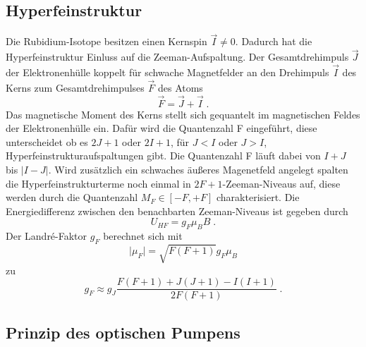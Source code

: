 \subsection{Hyperfeinstruktur}
Die Rubidium-Isotope besitzen einen Kernspin $\vec{I} \neq 0$. Dadurch hat die Hyperfeinstruktur 
Einluss auf die Zeeman-Aufspaltung. Der Gesamtdrehimpuls $\vec{J}$ der Elektronenhülle koppelt 
für schwache Magnetfelder an den Drehimpuls $\vec{I}$ des Kerns zum Gesamtdrehimpulses $\vec{F}$ 
des Atoms
\begin{equation}
\vec{F} = \vec{J} + \vec{I} \; .
\label{eq:F}
\end{equation}
Das magnetische Moment des Kerns stellt sich gequantelt im magnetischen Feldes der Elektronenhülle 
ein. Dafür wird die Quantenzahl F eingeführt, diese unterscheidet ob es $2J+1$ oder $2I+1$, 
für $J<I$ oder $J>I$, Hyperfeinstrukturaufspaltungen gibt. Die Quantenzahl F läuft dabei 
von $I+J$ bis $\lvert I-J \rvert$. Wird zusätzlich ein schwaches äußeres Magenetfeld angelegt 
spalten die Hyperfeinstrukturterme noch einmal in $2F+1$-Zeeman-Niveaus auf, diese werden durch 
die Quantenzahl $M_F \in [-F,+F]$ charakterisiert. Die Energiedifferenz zwischen den benachbarten 
Zeeman-Niveaus ist gegeben durch 
\begin{equation}
U_{HF} = g_F \mu_B B \; .	
\label{eq:UHF}
\end{equation}
Der Landr\'{e}-Faktor $g_F$ berechnet sich mit 
\begin{equation}
\lvert \mu_F \rvert = \sqrt{F(F+1)} g_F \mu_B	
\label{eq:muF}
\end{equation}
zu 
\begin{equation}
g_F \approx g_J \frac{F(F+1) + J(J+1) -I(I+1)}{2F(F+1)} \; .	
\end{equation}

\subsection{Prinzip des optischen Pumpens}

